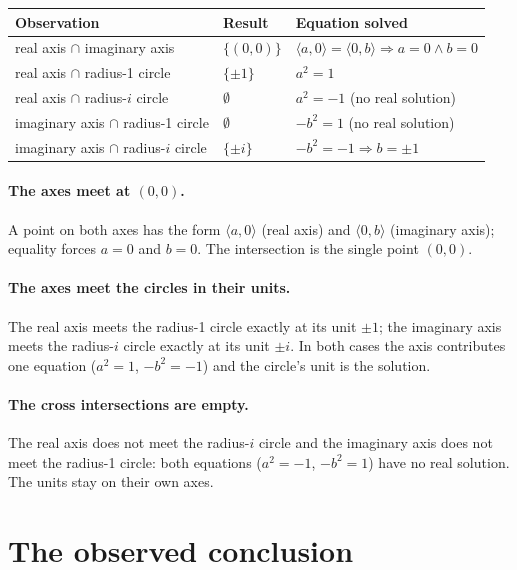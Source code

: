\documentclass[sigplan,10pt,anonymous,review]{acmart}
\begin{document}
\begin{center}
\begin{tabular}{lll}
\toprule
Observation & Result & Equation solved \\
\midrule
real axis $\cap$ imaginary axis & $\{(0,0)\}$ & $\langle a,0\rangle = \langle 0,b\rangle \Rightarrow a=0 \wedge b=0$ \\
real axis $\cap$ radius-1 circle & $\{\pm 1\}$ & $a^2 = 1$ \\
real axis $\cap$ radius-$i$ circle & $\emptyset$ & $a^2 = -1$ (no real solution) \\
imaginary axis $\cap$ radius-1 circle & $\emptyset$ & $-b^2 = 1$ (no real solution) \\
imaginary axis $\cap$ radius-$i$ circle & $\{\pm i\}$ & $-b^2 = -1 \Rightarrow b = \pm 1$ \\
\bottomrule
\end{tabular}
\end{center}

\paragraph{The axes meet at $(0,0)$.} A point on both axes has the form
$\langle a, 0\rangle$ (real axis) and $\langle 0, b\rangle$ (imaginary
axis); equality forces $a = 0$ and $b = 0$. The intersection is the
single point $(0,0)$.

\paragraph{The axes meet the circles in their units.} The real axis
meets the radius-1 circle exactly at its unit $\pm 1$; the imaginary
axis meets the radius-$i$ circle exactly at its unit $\pm i$. In both
cases the axis contributes one equation ($a^2 = 1$, $-b^2 = -1$) and
the circle's unit is the solution.

\paragraph{The cross intersections are empty.} The real axis does not
meet the radius-$i$ circle and the imaginary axis does not meet the
radius-1 circle: both equations ($a^2 = -1$, $-b^2 = 1$) have no real
solution. The units stay on their own axes.

\section{The observed conclusion}
\end{document}
